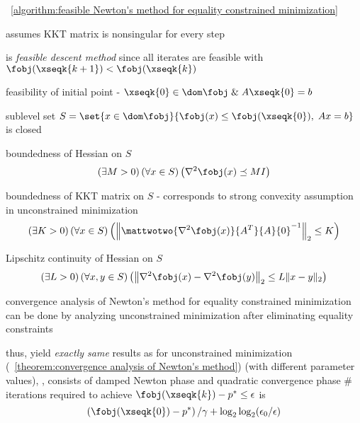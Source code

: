 \documentclass[17pt,landscape]{foils}
\begin{document}
{\bit
\vitem
	\algorithmname~\ref{algorithm:feasible Newton's method for equality constrained minimization}
	\bit
	\item
		assumes
		KKT matrix is nonsingular for every step
	\item
		is \emph{feasible descent method}
		since all iterates are feasible with $\fobj(\xseqk{k+1}) <\fobj(\xseqk{k})$
	\eit
\eit
\vfill



\bit
\item
	feasibility of initial point - $\xseqk{0}\in\dom \fobj \;\&\; A\xseqk{0}=b$

\vitem
	sublevel set $S = \set{x\in \dom \fobj}{\fobj(x) \leq \fobj(\xseqk{0}),\; Ax=b}$
	is closed

\vitem
	boundedness of Hessian on $S$
	$$
		\left(
			\exists M > 0
		\right)
		\left(
			\forall x\in S
		\right)
		\left(
			\nabla^2 \fobj(x) \preceq M I
		\right)
	$$

\vitem
	boundedness of KKT matrix on $S$
	- corresponds to strong convexity assumption in unconstrained minimization
	$$
		\left(
			\exists K >0
		\right)
		\left(
			\forall x \in S
		\right)
		\left(
			\left\|
			\mattwotwo{\nabla^2 \fobj(x)}{A^T}{A}{0}^{-1}
			\right\|_2
			\leq K
		\right)
	$$

\vitem
	Lipschitz continuity of Hessian on $S$
	$$
		\left(
			\exists L > 0
		\right)
		\left(
			\forall x,y\in S
		\right)
		\left(
			\left\|\nabla^2 \fobj(x) - \nabla^2 \fobj(y)\right\|_2
			\leq
			L
			\|x-y\|_2
		\right)
	$$
\eit
\vfill


%

\bit
\item
	convergence analysis of Newton's method for equality constrained minimization
	can be done by analyzing
	unconstrained minimization after eliminating equality constraints

\vitem
	thus, yield \emph{exactly same} results as
	for unconstrained minimization
	(\theoremname~\ref{theorem:convergence analysis of Newton's method})
	(with different parameter values),
	\ie,
	\bit
	\vitem
		consists of damped Newton phase and quadratic convergence phase
	\vitem
		\# iterations required to achieve $\fobj(\xseqk{k})-p^\ast \leq \epsilon$
		is
		$$
			\left(\fobj(\xseqk{0})-p^\ast\right)/\gamma + \log_2 \log_2 (\epsilon_0/\epsilon)
		$$
	\eit

}
\end{document}
